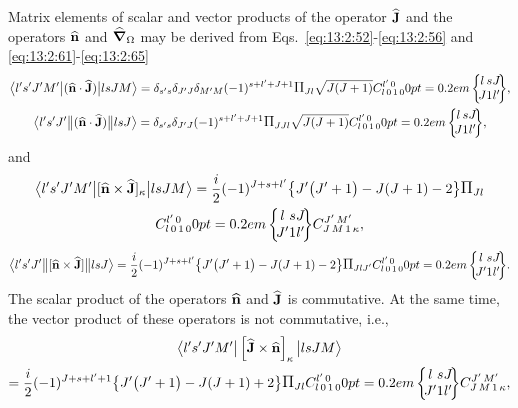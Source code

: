 Matrix elements of scalar and vector products of the operator \(\widehat{\mathbf{J}}\) and the operators \(\widehat{\mathbf{n}}\) and \(\widehat{\boldsymbol{\nabla}}_{\Omega}\) may be derived from Eqs.~\eqref{eq:13:2:52}-\eqref{eq:13:2:56} and \eqref{eq:13:2:61}-\eqref{eq:13:2:65}
\begin{gather}
\braOket{l^{\prime} s^{\prime} J^{\prime} M^{\prime}}{(\widehat{\vect{n}} \cdot \widehat{\vect{J}})}{ l s J M}=\delta_{s^{\prime} s} \delta_{J^{\prime} J} \delta_{M^{\prime} M}(-1)^{s+l^{\prime}+J+1} \Fact{J l}\sqrt{J(J+1)} 
\clebsch{l}{0}{1}{0}{l^{\prime}}{0}
\sixj{l}{s}{J}{J}{1}{l^{\prime}},  \label{eq:13:2:152}\\
\braOketred{l^{\prime} s^{\prime} J^{\prime}}{(\widehat{\vect{n}} \cdot \widehat{\vect{J}})}{ l s J}=\delta_{s^{\prime} s} \delta_{J^{\prime} J}(-1)^{s+l^{\prime}+J+1} \Fact{J J l}\sqrt{J(J+1)}
\clebsch{l}{0}{1}{0}{l^{\prime}}{0}
\sixj{l}{s}{J}{J}{1}{l^{\prime}} ,\notag
\end{gather}
and
\begin{multline}
\braOket{ l^{\prime} s^{\prime} J^{\prime} M^{\prime}}{[\widehat{\vect{n}} \times \widehat{\vect{J}}]_{\kappa}}{l s J M}=\frac{i}{2}(-1)^{J+s+l^{\prime}}\bigl\{J^{\prime}\bigl(J^{\prime}+1\bigr)-J(J+1)-2\bigr\} \Fact{J l}  \\
\clebsch{l}{0}{1}{0}{l^{\prime}}{0}
\sixj{l}{s}{J}{J^{\prime}}{1}{l^{\prime}} 
\clebsch{J}{M}{1}{\kappa}{J^{\prime}}{M^{\prime}}, \label{eq:13:2:153}
\end{multline}
\begin{equation*}
\braOketred{ l^{\prime} s^{\prime} J^{\prime}}{[\widehat{\vect{n}} \times \widehat{\vect{J}}]}{l s J}=\frac{i}{2}(-1)^{J+s+l^{\prime}}\bigl\{J^{\prime}\bigl(J^{\prime}+1\bigr)-J(J+1)-2\bigr\} \Fact{J l J^{\prime}} 
\clebsch{l}{0}{1}{0}{l^{\prime}}{0}
\sixj{l}{s}{J}{J^{\prime}}{1}{l^{\prime}}.
\end{equation*}
The scalar product of the operators \(\widehat{\mathbf{n}}\) and \(\widehat{\mathbf{J}}\) is commutative. At the same time, the vector product of these operators is not commutative, i.e.,
\begin{gather}
\braOket{ l^{\prime} s^{\prime} J^{\prime} M^{\prime}}{\left[ \widehat{\vect{J}} \times \widehat{\vect{n}}\right]_{\kappa}}{l s J M} \notag\\
=\frac{i}{2}(-1)^{J+s+l^{\prime}+1}\bigl\{J^{\prime}\bigl(J^{\prime}+1\bigr)-J(J+1)+2\bigr\} \Fact{J l} 
\clebsch{l}{0}{1}{0}{l^{\prime}}{0}
\sixj{l}{s}{J}{J^{\prime}}{1}{l^{\prime}}
\clebsch{J}{M}{1}{\kappa}{J^{\prime}}{M^{\prime}} , \label{eq:13:2:154}
\end{gather}

